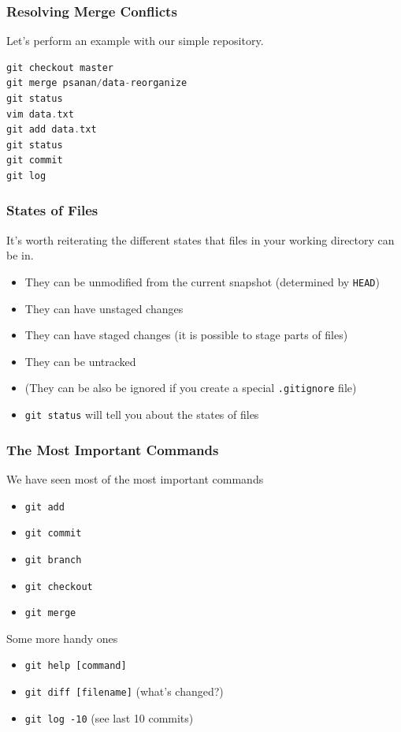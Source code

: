 \documentclass{beamer}
\begin{document}
\begin{frame}[fragile]
\frametitle{Resolving Merge Conflicts}
Let's perform an example with our simple repository.
\begin{lstlisting}[language=C++]
git checkout master
git merge psanan/data-reorganize
git status
vim data.txt
git add data.txt
git status
git commit
git log
\end{lstlisting}
\end{frame}

\begin{frame}[fragile]
\frametitle{States of Files}
It's worth reiterating the different states that files in your working directory can be in.
\begin{itemize}
\item They can be unmodified from the current snapshot (determined by \texttt{HEAD})
\item They can have unstaged changes
\item They can have staged changes (it is possible to stage parts of files)
\item They can be untracked
\item (They can be also be ignored if you create a special \texttt{.gitignore} file)
\item \lstinline{git status} will tell you about the states of files
\end{itemize}
\end{frame}

\begin{frame}[fragile]
\frametitle{The Most Important Commands}
We have seen most of the most important commands
\begin{itemize}
\item \lstinline{git add}
\item \lstinline{git commit}
\item \lstinline{git branch}
\item \lstinline{git checkout}
\item \lstinline{git merge}
\end{itemize}

Some more handy ones
\begin{itemize}
\item \lstinline{git help [command]}
\item \lstinline{git diff [filename]} (what's changed?)
\item \lstinline{git log -10} (see last 10 commits)
\end{itemize}
\end{frame}
\end{document}

